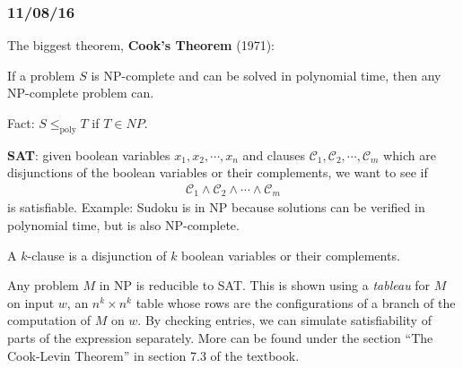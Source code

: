 \documentclass[a4paper,12pt]{article}
\theoremstyle{remark}
\theoremstyle{definition}
\begin{document}
\subsubsection*{11/08/16}
The biggest theorem, \textbf{Cook's Theorem} (1971): \par
\noindent If a problem $S$ is NP-complete and can be solved in polynomial time, then any NP-complete problem can. \par
Fact: $S \leq_{\text{poly}} T$ if $T \in NP$. \par
\textbf{SAT}: given boolean variables $x_1, x_2, \cdots, x_n$ and clauses $\mathcal{C}_1, \mathcal{C}_2, \cdots, \mathcal{C}_m$ which are disjunctions of the boolean variables or their complements, we want to see if
\begin{align*}
    \mathcal{C}_1 \land \mathcal{C}_2 \land \cdots \land \mathcal{C}_m
\end{align*}
is satisfiable. Example: Sudoku is in NP because solutions can be verified in polynomial time, but is also NP-complete. \par
A $k$-clause is a disjunction of $k$ boolean variables or their complements. \par
Any problem $M$ in NP is reducible to SAT. This is shown using a \emph{tableau} for $M$ on input $w$, an $n^k \times n^k$ table whose rows are the configurations of a branch of the computation of $M$ on $w$. By checking entries, we can simulate satisfiability of parts of the expression separately. More can be found under the section ``The Cook-Levin Theorem'' in section 7.3 of the textbook.
\end{document}
